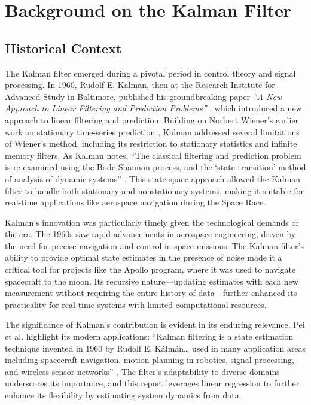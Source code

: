 \documentclass[12pt]{article}
\begin{document}
\section{Background on the Kalman Filter}
\label{sec:background}

\subsection{Historical Context}
\label{subsec:historical_context}

The Kalman filter emerged during a pivotal period in control theory and signal processing. In 1960, Rudolf E. Kalman, then at the Research Institute for Advanced Study in Baltimore, published his groundbreaking paper \textit{``A New Approach to Linear Filtering and Prediction Problems''} \cite{kalman1960}, which introduced a new approach to linear filtering and prediction. Building on Norbert Wiener’s earlier work on stationary time-series prediction \cite{wiener1949}, Kalman addressed several limitations of Wiener’s method, including its restriction to stationary statistics and infinite memory filters. As Kalman notes, “The classical filtering and prediction problem is re-examined using the Bode-Shannon process, and the ‘state transition’ method of analysis of dynamic systems” \cite{kalman1960}. This state-space approach allowed the Kalman filter to handle both stationary and nonstationary systems, making it suitable for real-time applications like aerospace navigation during the Space Race.

Kalman’s innovation was particularly timely given the technological demands of the era. The 1960s saw rapid advancements in aerospace engineering, driven by the need for precise navigation and control in space missions. The Kalman filter’s ability to provide optimal state estimates in the presence of noise made it a critical tool for projects like the Apollo program, where it was used to navigate spacecraft to the moon. Its recursive nature—updating estimates with each new measurement without requiring the entire history of data—further enhanced its practicality for real-time systems with limited computational resources.

The significance of Kalman’s contribution is evident in its enduring relevance. Pei et al. \cite{pei2019} highlight its modern applications: “Kalman filtering is a state estimation technique invented in 1960 by Rudolf E. Kálmán… used in many application areas including spacecraft navigation, motion planning in robotics, signal processing, and wireless sensor networks” \cite{pei2019}. The filter’s adaptability to diverse domains underscores its importance, and this report leverages linear regression to further enhance its flexibility by estimating system dynamics from data.
\end{document}
